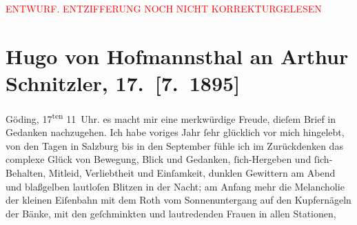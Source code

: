 
\begin{center}
            \textcolor{red}{ENTWURF. ENTZIFFERUNG NOCH NICHT KORREKTURGELESEN}
                      \end{center}
            
               \section[Hugo von Hofmannsthal an Arthur Schnitzler, 17. {[}7. 1895{]}]{ Hugo von Hofmannsthal an Arthur Schnitzler, 17. {[}7. 1895{]}}\nopagebreak{}\rehead{ }\begin{ledgroupsized}[t]{13cm}\normalsize\beginnumbering{} \toendnotes[C]{\smallbreak\pagebreak[2]} 
\toendnotes[C]{\smallbreak}\pstart
           \raggedleft{}{\pb}Göding, 17\textsuperscript{ten}{ }11 Uhr. \pend
           \pstart
           \raggedleft{}\textcolor{gray}{\textbf{}}\pend
           \pstart
           es macht mir eine merkwürdige Freude, dieſem Brief in Gedanken nachzugehen. Ich
                    habe voriges Jahr ſehr glücklich vor mich hingelebt, von den Tagen in Salzburg bis in den September fühle
                    ich im Zurückdenken das complexe Glück von Bewegung, Blick und Gedanken,
                    ſich-Hergeben und ſich-Behalten, Mitleid, Verliebtheit und Einſamkeit, dunklen
                    Gewittern am Abend und blaßgelben lautloſen Blitzen in der Nacht; am Anfang mehr
                    die Melancholie der kleinen Eiſenbahn mit dem Roth vom Sonnenuntergang auf den
                    Kupfernägeln der Bänke, mit den geſchminkten und lautredenden {\pb}Frauen in allen Stationen,

\end{ledgroupsized}
